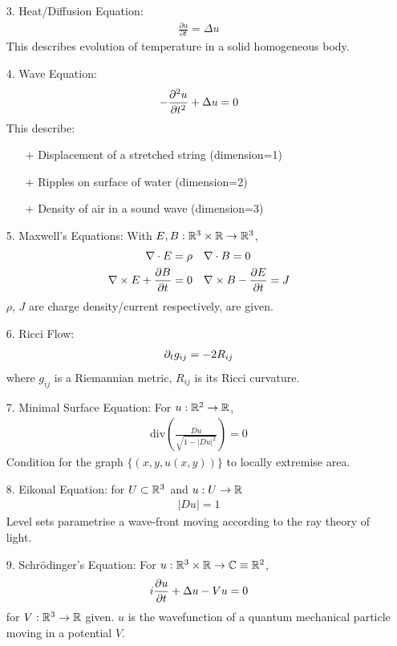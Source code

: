 \documentclass[12pt,a4paper]{report}
\begin{document}
\begin{itemize}
\item[3.] Heat/Diffusion Equation:
\begin{align*}
\frac{\partial u}{\partial t} = \Delta u
\end{align*}
This describes evolution of temperature in a solid homogeneous body.

\item[4.] Wave Equation:
\begin{align*}
-\frac{\partial^2 u}{\partial t^2} + \Delta u =0
\end{align*}
This describe: \begin{itemize}
\item[+] Displacement of a stretched string (dimension=1)
\item[+] Ripples on surface of water (dimension=2)
\item[+] Density of air in a sound wave (dimension=3)
\end{itemize}

\item[5.] Maxwell's Equations:
With $E,B : \mathbb{R}^3 \times \mathbb{R} \rightarrow \mathbb{R}^3$,
\begin{align*}
\nabla \cdot E = \rho & \quad \nabla \cdot B =0 \\
\nabla \times E + \frac{\partial B}{\partial t} =0 & \quad \nabla \times B - \frac{\partial E}{\partial t} = J
\end{align*}
$\rho$, $J$ are charge density/current respectively, are given.

\item[6.] Ricci Flow:
\begin{align*}
\partial_t g_{ij} = -2R_{ij}
\end{align*}
where $g_{ij}$ is a Riemannian metric, $R_{ij}$ is its Ricci curvature.

\item[7.] Minimal Surface Equation:
For $u: \mathbb{R}^2 \rightarrow \mathbb{R}$,
\begin{align*}
\text{div}(\frac{Du}{\sqrt{1-|Du|^2}}) =0
\end{align*}
Condition for the graph $\{ (x,y,u(x,y)) \}$ to locally extremise area.

\item[8.] Eikonal Equation:
for $U\subset \mathbb{R}^3$ and $u:U\rightarrow \mathbb{R}$
\begin{align*}
|Du|=1
\end{align*}
Level sets parametrise a wave-front moving according to the ray theory of light. 

\item[9.] Schr\"{o}dinger's Equation:
For $u:\mathbb{R}^3 \times \mathbb{R} \rightarrow \mathbb{C} \equiv \mathbb{R}^2$,
\begin{align*}
i\frac{\partial u}{\partial t} + \Delta u - Vu =0
\end{align*}
for $V: \mathbb{R}^3\rightarrow \mathbb{R}$ given. $u$ is the wavefunction of a quantum mechanical particle moving in a potential $V$.


\end{itemize}
\end{document}
